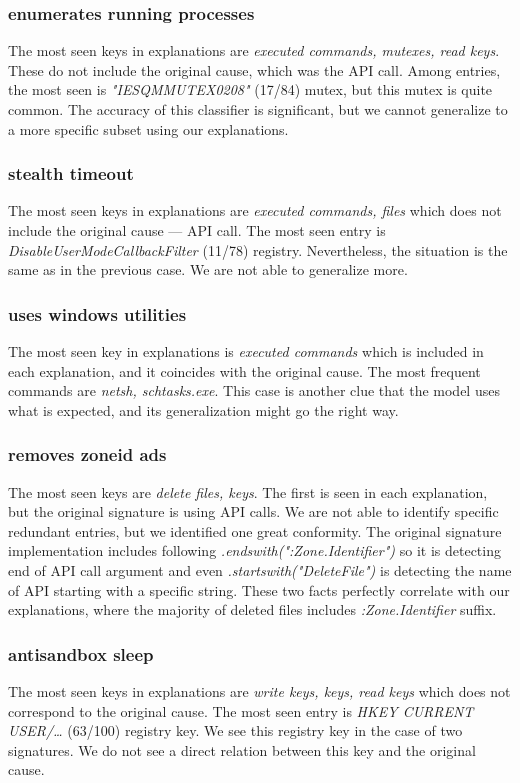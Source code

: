 \subsubsection*{enumerates running processes}
The most seen keys in explanations are \emph{executed commands, mutexes, read keys}. These do not include the original cause, which was the API call.  Among entries, the most seen is \emph{"IESQMMUTEX0208"} (17/84) mutex, but this mutex is quite common. The accuracy of this classifier is significant, but we cannot generalize to a more specific subset using our explanations.

\subsubsection*{stealth timeout}
The most seen keys in explanations are \emph{executed commands, files} which does not include the original cause --- API call. The most seen entry is \emph{DisableUserModeCallbackFilter} (11/78) registry. Nevertheless, the situation is the same as in the previous case. We are not able to generalize more.

\subsubsection*{uses windows utilities}
The most seen key in explanations is \emph{executed commands} which is included in each explanation, and it coincides with the original cause. The most frequent commands are \emph{netsh, schtasks.exe}. This case is another clue that the model uses what is expected, and its generalization might go the right way.

\subsubsection*{removes zoneid ads}
The most seen keys are \emph{delete files, keys}. The first is seen in each explanation, but the original signature is using API calls. We are not able to identify specific redundant entries, but we identified one great conformity. The original signature implementation includes following \emph{.endswith(":Zone.Identifier")} so it is detecting end of API call argument and even \emph{.startswith("DeleteFile")} is detecting the name of API starting with a specific string. These two facts perfectly correlate with our explanations, where the majority of deleted files includes \emph{:Zone.Identifier} suffix.

\subsubsection*{antisandbox sleep}
The most seen keys in explanations are \emph{write keys, keys, read keys} which does not correspond to the original cause. The most seen entry is \emph{HKEY CURRENT USER/\dots} (63/100) registry key. We see this registry key in the case of two signatures. We do not see a direct relation between this key and the original cause.

